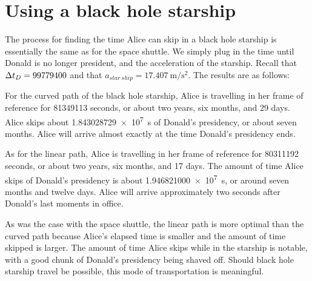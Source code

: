 \section{Using a black hole starship}
The process for finding the time Alice can skip in a black hole starship is essentially the same as for the space shuttle. We simply plug in the time until Donald is no longer president, and the acceleration of the starship. Recall that $\mathrm{\Delta} t_D = 99779400$ and that $a_{star\ ship} = \SI{17.407}{\metre/\second^2}$. The results are as follows:

For the curved path of the black hole starship, Alice is travelling in her frame of reference for \num{81349113} seconds, or about two years, six months, and 29 days. Alice skips about \SI{1.843028729e7}{\second} of Donald’s presidency, or about seven months. Alice will arrive almost exactly at the time Donald’s presidency ends.

As for the linear path, Alice is travelling in her frame of reference for \num{80311192} seconds, or about two years, six months, and 17 days. The amount of time Alice skips of Donald’s presidency is about \SI{1.946821000e7}{\second}, or around seven months and twelve days. Alice will arrive approximately two seconds after Donald’s last moments in office.

As was the case with the space shuttle, the linear path is more optimal than the curved path because Alice’s elapsed time is smaller and the amount of time skipped is larger. The amount of time Alice skips while in the starship is notable, with a good chunk of Donald’s presidency being shaved off. Should black hole starship travel be possible, this mode of transportation is meaningful.
